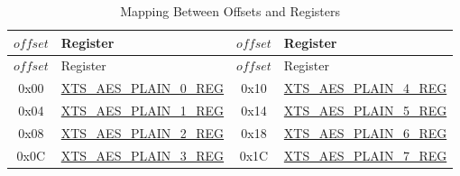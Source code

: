 \begin{longtable}[c]
{ |c|p{4.5cm} |c|p{4.5cm}|}
\caption{Mapping Between Offsets and Registers} 
\label{tab:extmemencr-data-padding}\\
\hline 
\rowcolor{lightgray}
\begin{math} offset \end{math}&  Register  & \begin{math} offset \end{math} &  Register \\\hline
\endfirsthead
\hline
\rowcolor{lightgray}
\begin{math} offset \end{math} &  Register  & \begin{math} offset \end{math} &  Register   \\\hline
\endhead
\endfoot
0x00 & \hyperref[regdesc:XTSAESPLAINNREG]{XTS\_AES\_PLAIN\_0\_REG} & 0x10 & \hyperref[regdesc:XTSAESPLAINNREG]{XTS\_AES\_PLAIN\_4\_REG} \\\hline 
0x04 & \hyperref[regdesc:XTSAESPLAINNREG]{XTS\_AES\_PLAIN\_1\_REG} & 0x14 & \hyperref[regdesc:XTSAESPLAINNREG]{XTS\_AES\_PLAIN\_5\_REG} \\\hline 
0x08 & \hyperref[regdesc:XTSAESPLAINNREG]{XTS\_AES\_PLAIN\_2\_REG} & 0x18 & \hyperref[regdesc:XTSAESPLAINNREG]{XTS\_AES\_PLAIN\_6\_REG} \\\hline 
0x0C & \hyperref[regdesc:XTSAESPLAINNREG]{XTS\_AES\_PLAIN\_3\_REG} & 0x1C & \hyperref[regdesc:XTSAESPLAINNREG]{XTS\_AES\_PLAIN\_7\_REG} \\\hline 
\end{longtable}

